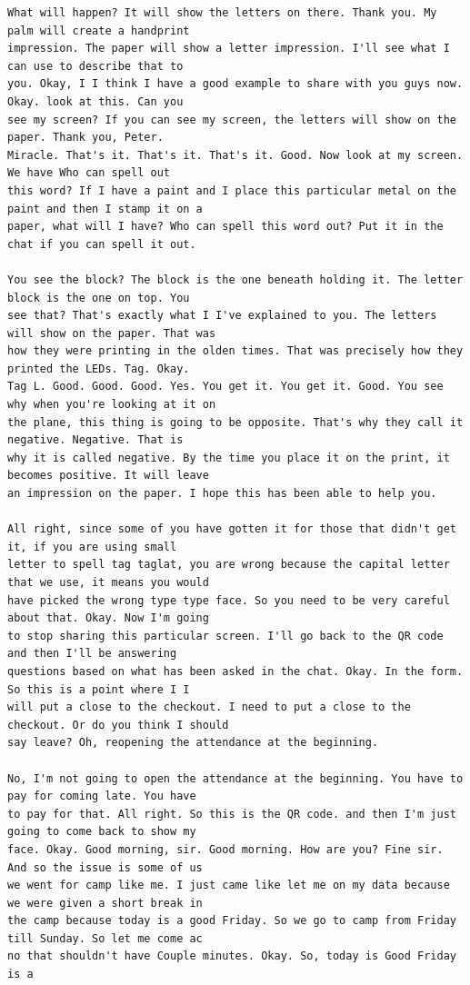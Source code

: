 {\begin{Verbatim}
What will happen? It will show the letters on there. Thank you. My palm will create a handprint
impression. The paper will show a letter impression. I'll see what I can use to describe that to
you. Okay, I I think I have a good example to share with you guys now. Okay. look at this. Can you
see my screen? If you can see my screen, the letters will show on the paper. Thank you, Peter.
Miracle. That's it. That's it. That's it. Good. Now look at my screen. We have Who can spell out
this word? If I have a paint and I place this particular metal on the paint and then I stamp it on a
paper, what will I have? Who can spell this word out? Put it in the chat if you can spell it out.

You see the block? The block is the one beneath holding it. The letter block is the one on top. You
see that? That's exactly what I I've explained to you. The letters will show on the paper. That was
how they were printing in the olden times. That was precisely how they printed the LEDs. Tag. Okay.
Tag L. Good. Good. Good. Yes. You get it. You get it. Good. You see why when you're looking at it on
the plane, this thing is going to be opposite. That's why they call it negative. Negative. That is
why it is called negative. By the time you place it on the print, it becomes positive. It will leave
an impression on the paper. I hope this has been able to help you.

All right, since some of you have gotten it for those that didn't get it, if you are using small
letter to spell tag taglat, you are wrong because the capital letter that we use, it means you would
have picked the wrong type type face. So you need to be very careful about that. Okay. Now I'm going
to stop sharing this particular screen. I'll go back to the QR code and then I'll be answering
questions based on what has been asked in the chat. Okay. In the form. So this is a point where I I
will put a close to the checkout. I need to put a close to the checkout. Or do you think I should
say leave? Oh, reopening the attendance at the beginning.

No, I'm not going to open the attendance at the beginning. You have to pay for coming late. You have
to pay for that. All right. So this is the QR code. and then I'm just going to come back to show my
face. Okay. Good morning, sir. Good morning. How are you? Fine sir. And so the issue is some of us
we went for camp like me. I just came like let me on my data because we were given a short break in
the camp because today is a good Friday. So we go to camp from Friday till Sunday. So let me come ac
no that shouldn't have Couple minutes. Okay. So, today is Good Friday is a


\end{Verbatim}}
